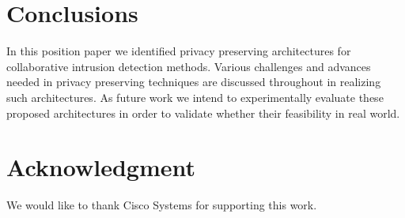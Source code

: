 \documentclass[runningheads,a4paper]{llncs}
\begin{document}
\begin{comment}
\subsection{Sidebox Approach}
Using Searchable Encryption
\begin{figure} 
  \begin{center}
    \texttt{[image: Images/dpi-sb.png]}
  \end{center}
  \caption{Blind folded DPI Side Box }
  \label{fig:pir}
\end{figure}
\subsubsection{Threat Model}

\subsection{Challenges}
efficient string match, regular expression matching 

\end{comment}
\section{Conclusions}\label{section:con}
In this position paper we identified privacy preserving architectures for collaborative intrusion detection methods. Various challenges and advances needed in privacy preserving techniques are discussed throughout in realizing such architectures. As future work we intend to experimentally evaluate these proposed architectures in order to validate whether their feasibility in real world. 
\section*{Acknowledgment}
We would like to  thank Cisco Systems for  supporting this work. 





\end{document}

